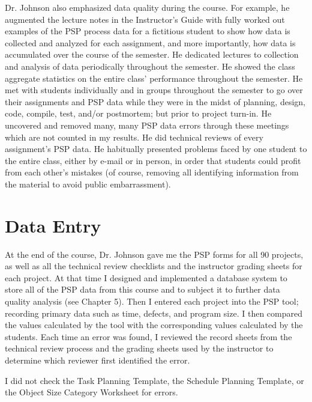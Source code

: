 Dr. Johnson also emphasized data quality during the course.  For example,
he augmented the lecture notes in the Instructor's Guide with fully worked
out examples of the PSP process data for a fictitious student to show how
data is collected and analyzed for each assignment, and more importantly,
how data is accumulated over the course of the semester.  He dedicated
lectures to collection and analysis of data periodically throughout the
semester. He showed the class aggregate statistics on the entire class'
performance throughout the semester.  He met with students individually and
in groups throughout the semester to go over their assignments and PSP data
while they were in the midst of planning, design, code, compile, test,
and/or postmortem; but prior to project turn-in.  He uncovered and removed
many, many PSP data errors through these meetings which are not counted in
my results.  He did technical reviews of every assignment's PSP data.  He
habitually presented problems faced by one student to the entire class,
either by e-mail or in person, in order that students could profit from each
other's mistakes (of course, removing all identifying information from
the material to avoid public embarrassment).

\section{Data Entry}

At the end of the course, Dr. Johnson gave me the PSP forms for all 90
projects, as well as all the technical review checklists and the instructor
grading sheets for each project.  At that time I designed and implemented a
database system to store all of the PSP data from this course and to
subject it to further data quality analysis (see Chapter 5). Then I entered
each project into the PSP tool; recording primary data such as time,
defects, and program size.  I then compared the values calculated by the
tool with the corresponding values calculated by the students. Each time an
error was found, I reviewed the record sheets from the technical review
process and the grading sheets used by the instructor to determine which
reviewer first identified the error.

I did not check the Task Planning Template, the Schedule Planning Template, 
or the Object Size Category Worksheet for errors.

